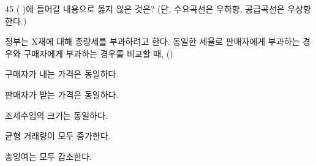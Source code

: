 \begin{question}{45}
( )에 들어갈 내용으로 옳지 않은 것은? (단, 수요곡선은 우하향, 공급곡선은 우상향한다.)
\begin{framedtext}
정부는 X재에 대해 종량세를 부과하려고 한다. 동일한 세율로 판매자에게 부과하는 경우와 구매자에게 부과하는 경우를 비교할 때, (\quad\quad\quad\quad)
\end{framedtext}
\begin{choices}
  \item 구매자가 내는 가격은 동일하다.
  \item 판매자가 받는 가격은 동일하다.
  \item 조세수입의 크기는 동일하다.
  \item 균형 거래량이 모두 증가한다.
  \item 총잉여는 모두 감소한다.
\end{choices}
\end{question}
